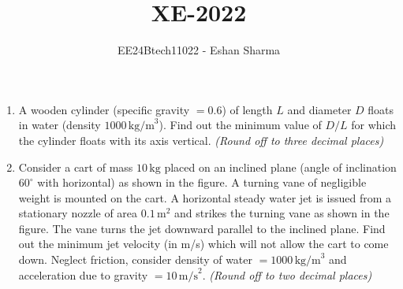 \documentclass[journal,12pt,onecolumn]{IEEEtran}
\theoremstyle{remark}
\begin{document}

\vspace{3cm}

\title{XE-2022}
\author{EE24Btech11022 - Eshan Sharma}
\maketitle

\renewcommand{\thefigure}{\theenumi}
\renewcommand{\thetable}{\theenumi}



\begin{enumerate}
\item A wooden cylinder (specific gravity $= 0.6$) of length $L$ and diameter $D$ floats in water (density $1000 \, \text{kg/m}^3$). Find out the minimum value of $D/L$ for which the cylinder floats with its axis vertical. \textit{(Round off to three decimal places)}\\

\item Consider a cart of mass $10 \, \text{kg}$ placed on an inclined plane (angle of inclination $60^\circ$ with horizontal) as shown in the figure. A turning vane of negligible weight is mounted on the cart. A horizontal steady water jet is issued from a stationary nozzle of area $0.1 \, \text{m}^2$ and strikes the turning vane as shown in the figure. The vane turns the jet downward parallel to the inclined plane. Find out the minimum jet velocity (in m/s) which will not allow the cart to come down. Neglect friction, consider density of water $= 1000 \, \text{kg/m}^3$ and acceleration due to gravity $= 10 \, \text{m/s}^2$. \textit{(Round off to two decimal places)}\\


\end{enumerate}
\end{document}
